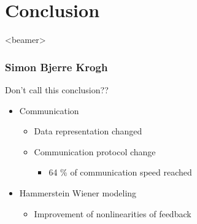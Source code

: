 \section{Conclusion}
\begin{frame}<beamer>
\frametitle{Simon Bjerre Krogh}
\tableofcontents[currentsection]
\end{frame}


\begin{frame}{Don't call this conclusion??}{}

  \begin{itemize}
    \item<1-> Communication 
    \begin{itemize}
    	\item Data representation changed 
    	\item Communication protocol change 
    	\begin{itemize}
    	\item 64 \% of communication speed reached 
     	\end{itemize}
     \end{itemize}
    \item Hammerstein Wiener modeling 
    \begin{itemize}
    	\item Improvement of nonlinearities of feedback 
    \end{itemize}
  \end{itemize}


\end{frame}



